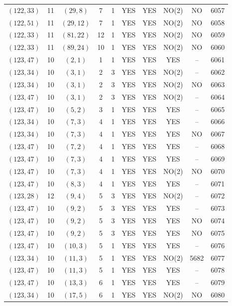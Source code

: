 \begin{longtable}{|c|c|c|c|c|c|c|c|c|c|}
$(122, 33)$ & 11 & $(29, 8)$ & 7 & 1 & YES & YES & NO(2) & NO & 6057\\
$(122, 51)$ & 11 & $(29, 12)$ & 7 & 1 & YES & YES & NO(2) & NO & 6058\\
$(122, 33)$ & 11 & $(81, 22)$ & 12 & 1 & YES & YES & NO(2) & NO & 6059\\
$(122, 33)$ & 11 & $(89, 24)$ & 10 & 1 & YES & YES & NO(2) & NO & 6060\\
$(123, 47)$ & 10 & $(2, 1)$ & 1 & 1 & YES & YES & YES & -- & 6061\\
$(123, 34)$ & 10 & $(3, 1)$ & 2 & 3 & YES & YES & NO(2) & -- & 6062\\
$(123, 34)$ & 10 & $(3, 1)$ & 2 & 3 & YES & YES & NO(2) & NO & 6063\\
$(123, 47)$ & 10 & $(3, 1)$ & 2 & 3 & YES & YES & NO(2) & -- & 6064\\
$(123, 47)$ & 10 & $(5, 2)$ & 3 & 1 & YES & YES & YES & -- & 6065\\
$(123, 34)$ & 10 & $(7, 3)$ & 4 & 1 & YES & YES & YES & -- & 6066\\
$(123, 34)$ & 10 & $(7, 3)$ & 4 & 1 & YES & YES & YES & NO & 6067\\
$(123, 47)$ & 10 & $(7, 2)$ & 4 & 1 & YES & YES & YES & -- & 6068\\
$(123, 47)$ & 10 & $(7, 3)$ & 4 & 1 & YES & YES & YES & -- & 6069\\
$(123, 47)$ & 10 & $(7, 3)$ & 4 & 1 & YES & YES & NO(2) & NO & 6070\\
$(123, 47)$ & 10 & $(8, 3)$ & 4 & 1 & YES & YES & YES & -- & 6071\\
$(123, 28)$ & 12 & $(9, 4)$ & 5 & 3 & YES & YES & NO(2) & -- & 6072\\
$(123, 47)$ & 10 & $(9, 2)$ & 5 & 3 & YES & YES & YES & -- & 6073\\
$(123, 47)$ & 10 & $(9, 2)$ & 5 & 3 & YES & YES & YES & NO & 6074\\
$(123, 47)$ & 10 & $(9, 2)$ & 5 & 3 & YES & YES & YES & NO & 6075\\
$(123, 47)$ & 10 & $(10, 3)$ & 5 & 1 & YES & YES & YES & -- & 6076\\
$(123, 34)$ & 10 & $(11, 3)$ & 5 & 1 & YES & YES & NO(2) & 5682 & 6077\\
$(123, 47)$ & 10 & $(11, 3)$ & 5 & 1 & YES & YES & YES & -- & 6078\\
$(123, 47)$ & 10 & $(13, 3)$ & 6 & 1 & YES & YES & YES & -- & 6079\\
$(123, 34)$ & 10 & $(17, 5)$ & 6 & 1 & YES & YES & NO(2) & NO & 6080\\

\end{longtable}
